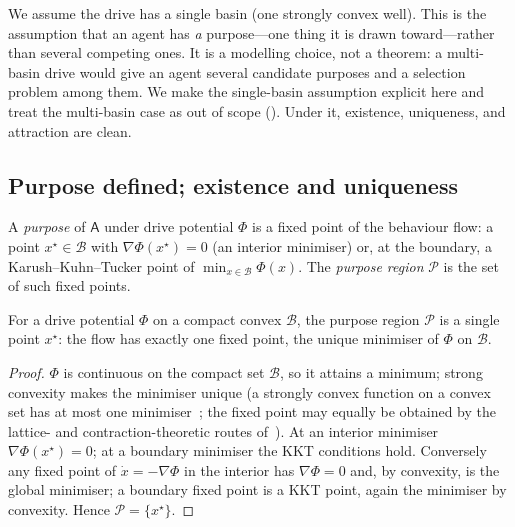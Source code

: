 \documentclass[11pt,twocolumn,a4paper]{article}
\newcommand{\Agent}{\mathsf{A}}
\newcommand{\Beh}{\mathcal{B}}       %
\newcommand{\Purp}{\mathcal{P}}      %
\begin{document}
\begin{remark}
\label{rem:convex}
We assume the drive has a single basin (one strongly convex well). This
is the assumption that an agent has \emph{a} purpose---one thing it is
drawn toward---rather than several competing ones. It is a modelling
choice, not a theorem: a multi-basin drive would give an agent several
candidate purposes and a selection problem among them. We make the
single-basin assumption explicit here and treat the multi-basin case as
out of scope (). Under it, existence, uniqueness, and
attraction are clean.
\end{remark}

\subsection{Purpose defined; existence and uniqueness}

\begin{definition}[Purpose]
\label{def:purpose}
A \emph{purpose} of $\Agent$ under drive potential $\Phi$ is a fixed point
of the behaviour flow: a point $x^\star\in\Beh$ with
$\nabla\Phi(x^\star)=0$ (an interior minimiser) or, at the boundary, a
Karush--Kuhn--Tucker point of $\min_{x\in\Beh}\Phi(x)$. The \emph{purpose
region} $\Purp$ is the set of such fixed points.
\end{definition}

\begin{theorem}
\label{thm:purpexist}
For a drive potential $\Phi$ on a compact convex $\Beh$, the purpose
region $\Purp$ is a single point $x^\star$: the flow has exactly one fixed
point, the unique minimiser of $\Phi$ on $\Beh$.
\end{theorem}

\begin{proof}
$\Phi$ is continuous on the compact set $\Beh$, so it attains a minimum;
strong convexity makes the minimiser unique (a strongly convex function on
a convex set has at most one minimiser~\cite{boydvandenberghe2004}; the
fixed point may equally be obtained by the lattice- and
contraction-theoretic routes of~\cite{tarski1955,banach1922}). At an
interior minimiser
$\nabla\Phi(x^\star)=0$; at a boundary minimiser the KKT conditions hold.
Conversely any fixed point of $\dot x=-\nabla\Phi$ in the interior has
$\nabla\Phi=0$ and, by convexity, is the global minimiser; a boundary
fixed point is a KKT point, again the minimiser by convexity. Hence
$\Purp=\{x^\star\}$.
\end{proof}
\end{document}
